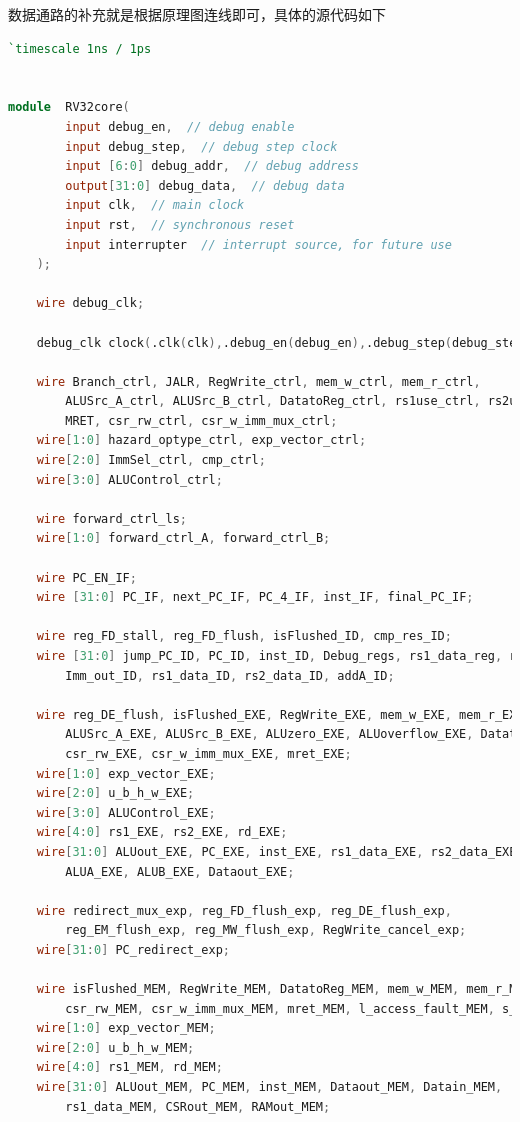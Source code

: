 数据通路的补充就是根据原理图连线即可，具体的源代码如下
\begin{lstlisting}[language = {verilog}]
`timescale 1ns / 1ps


module  RV32core(
        input debug_en,  // debug enable
        input debug_step,  // debug step clock
        input [6:0] debug_addr,  // debug address
        output[31:0] debug_data,  // debug data
        input clk,  // main clock
        input rst,  // synchronous reset
        input interrupter  // interrupt source, for future use
    );

    wire debug_clk;

    debug_clk clock(.clk(clk),.debug_en(debug_en),.debug_step(debug_step),.debug_clk(debug_clk));

    wire Branch_ctrl, JALR, RegWrite_ctrl, mem_w_ctrl, mem_r_ctrl,
        ALUSrc_A_ctrl, ALUSrc_B_ctrl, DatatoReg_ctrl, rs1use_ctrl, rs2use_ctrl,
        MRET, csr_rw_ctrl, csr_w_imm_mux_ctrl;
    wire[1:0] hazard_optype_ctrl, exp_vector_ctrl;
    wire[2:0] ImmSel_ctrl, cmp_ctrl;
    wire[3:0] ALUControl_ctrl;

    wire forward_ctrl_ls;
    wire[1:0] forward_ctrl_A, forward_ctrl_B;

    wire PC_EN_IF;
    wire [31:0] PC_IF, next_PC_IF, PC_4_IF, inst_IF, final_PC_IF;

    wire reg_FD_stall, reg_FD_flush, isFlushed_ID, cmp_res_ID;
    wire [31:0] jump_PC_ID, PC_ID, inst_ID, Debug_regs, rs1_data_reg, rs2_data_reg,
        Imm_out_ID, rs1_data_ID, rs2_data_ID, addA_ID;
    
    wire reg_DE_flush, isFlushed_EXE, RegWrite_EXE, mem_w_EXE, mem_r_EXE,
        ALUSrc_A_EXE, ALUSrc_B_EXE, ALUzero_EXE, ALUoverflow_EXE, DatatoReg_EXE,
        csr_rw_EXE, csr_w_imm_mux_EXE, mret_EXE;
    wire[1:0] exp_vector_EXE;
    wire[2:0] u_b_h_w_EXE;
    wire[3:0] ALUControl_EXE;
    wire[4:0] rs1_EXE, rs2_EXE, rd_EXE;
    wire[31:0] ALUout_EXE, PC_EXE, inst_EXE, rs1_data_EXE, rs2_data_EXE, Imm_EXE,
        ALUA_EXE, ALUB_EXE, Dataout_EXE;

    wire redirect_mux_exp, reg_FD_flush_exp, reg_DE_flush_exp,
        reg_EM_flush_exp, reg_MW_flush_exp, RegWrite_cancel_exp;
    wire[31:0] PC_redirect_exp;
    
    wire isFlushed_MEM, RegWrite_MEM, DatatoReg_MEM, mem_w_MEM, mem_r_MEM,
        csr_rw_MEM, csr_w_imm_mux_MEM, mret_MEM, l_access_fault_MEM, s_access_fault_MEM;
    wire[1:0] exp_vector_MEM;
    wire[2:0] u_b_h_w_MEM;
    wire[4:0] rs1_MEM, rd_MEM;
    wire[31:0] ALUout_MEM, PC_MEM, inst_MEM, Dataout_MEM, Datain_MEM,
        rs1_data_MEM, CSRout_MEM, RAMout_MEM;



\end{lstlisting}
